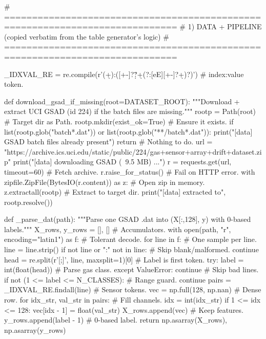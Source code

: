 # =============================================================================
# 1) DATA + PIPELINE  (copied verbatim from the table generator's logic)
# =============================================================================

_IDXVAL_RE = re.compile(r'(\d+):([+-]?\d*\.?\d+(?:[eE][+-]?\d+)?)')  # index:value token.

def download_gsad_if_missing(root=DATASET_ROOT):
    """Download + extract UCI GSAD (id 224) if the batch files are missing."""
    rootp = Path(root)                              # Target dir as Path.
    rootp.mkdir(exist_ok=True)                      # Ensure it exists.
    if list(rootp.glob("batch*.dat")) or list(rootp.glob("**/batch*.dat")):
        print("[data] GSAD batch files already present")
        return                                      # Nothing to do.
    url = "https://archive.ics.uci.edu/static/public/224/gas+sensor+array+drift+dataset.zip"
    print("[data] downloading GSAD (~9.5 MB) ...")
    r = requests.get(url, timeout=60)               # Fetch archive.
    r.raise_for_status()                            # Fail on HTTP error.
    with zipfile.ZipFile(BytesIO(r.content)) as z:  # Open zip in memory.
        z.extractall(rootp)                         # Extract to target dir.
    print("[data] extracted to", rootp.resolve())

def _parse_dat(path):
    """Parse one GSAD .dat into (X[:,128], y) with 0-based labels."""
    X_rows, y_rows = [], []                         # Accumulators.
    with open(path, "r", encoding="latin1") as f:   # Tolerant decode.
        for line in f:                              # One sample per line.
            line = line.strip()
            if not line or ":" not in line:         # Skip blank/malformed.
                continue
            head = re.split(r'[;\s]', line, maxsplit=1)[0]  # Label is first token.
            try:
                label = int(float(head))            # Parse gas class.
            except ValueError:
                continue                            # Skip bad lines.
            if not (1 <= label <= N_CLASSES):       # Range guard.
                continue
            pairs = _IDXVAL_RE.findall(line)        # Sensor tokens.
            vec = np.full(128, np.nan)              # Dense row.
            for idx_str, val_str in pairs:          # Fill channels.
                idx = int(idx_str)
                if 1 <= idx <= 128:
                    vec[idx - 1] = float(val_str)
            X_rows.append(vec)                      # Keep features.
            y_rows.append(label - 1)                # 0-based label.
    return np.asarray(X_rows), np.asarray(y_rows)

